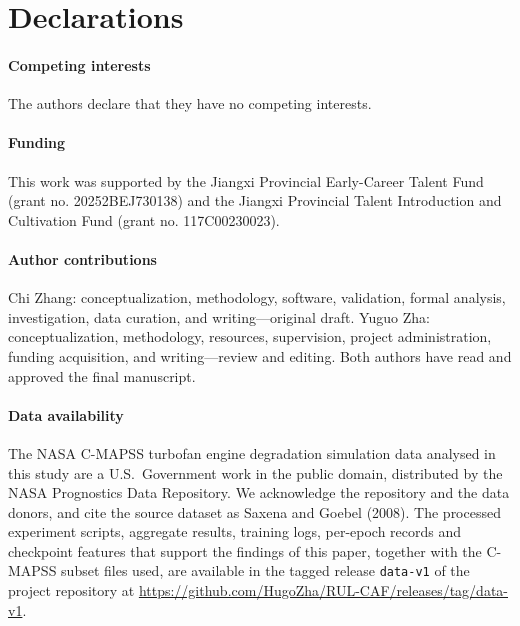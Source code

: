 \section*{Declarations}

\paragraph{Competing interests}
The authors declare that they have no competing interests.

\paragraph{Funding}
This work was supported by the Jiangxi Provincial Early-Career Talent Fund
(grant no. 20252BEJ730138) and the Jiangxi Provincial Talent Introduction and
Cultivation Fund (grant no. 117C00230023).

\paragraph{Author contributions}
Chi Zhang: conceptualization, methodology, software, validation, formal
analysis, investigation, data curation, and writing---original draft.
Yuguo Zha: conceptualization, methodology, resources, supervision, project
administration, funding acquisition, and writing---review and editing.
Both authors have read and approved the final manuscript.

\paragraph{Data availability}
The NASA C-MAPSS turbofan engine degradation simulation data analysed in
this study are a U.S.\ Government work in the public domain, distributed by
the NASA Prognostics Data Repository. We acknowledge the repository and the
data donors, and cite the source dataset as Saxena and Goebel (2008). The
processed experiment scripts, aggregate results, training logs, per-epoch
records and checkpoint features that support the findings of this paper,
together with the C-MAPSS subset files used, are available in the tagged
release \texttt{data-v1} of the project repository at
\url{https://github.com/HugoZha/RUL-CAF/releases/tag/data-v1}.
